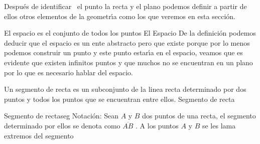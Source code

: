 \vspace*{20pt}
\label{sec:1.3}
Despu\'{e}s de identificar \ el punto la recta y el plano podemos definir a
partir de \\ ellos otros elementos de la geometr\'{\i}a como los que veremos en
esta secci\'{o}n. \\
\begin{definicion}{El espacio es el conjunto de todos los puntos \hfill}{El Espacio}
De la definici\'{o}n podemos deducir que el espacio es un ente abstracto
pero que existe porque por lo menos podemos construir un punto y este punto
estar\'{\i}a en el espacio, veamos que es evidente que existen infinitos puntos y
que muchos no se encuentran en un plano por lo que es necesario hablar del
espacio.
\end{definicion}
\begin{definicion}{Un segmento de recta es un subconjunto de la linea recta determinado por dos
puntos y todos los puntos que se encuentran entre ellos.
}{Segmento de recta}
 \begin{figura}{
}{Segmento de recta}{seg}
 Notaci\'{o}n: Sean $A$ y $B$ dos puntos de una recta, el segmento
determinado por ellos se denota como $\overline{AB}$ . A los puntos $A$ y $B$
se les lama extremos del segmento
 \end{figura}
\end{definicion}
